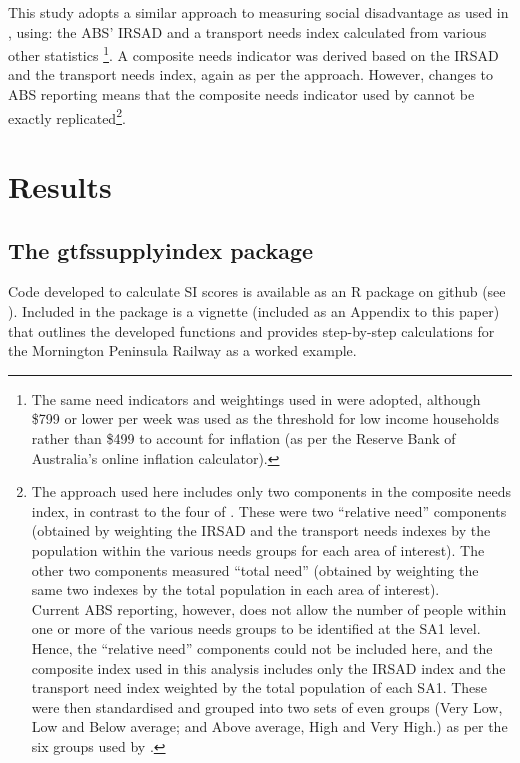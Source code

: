 \documentclass[preprint, 3p,
authoryear]{elsarticle} %
\begin{document}
This study adopts a similar approach to measuring social disadvantage as
used in \citet{currie2010identifying}, using: the ABS' IRSAD and a
transport needs index calculated from various other statistics
\footnote{The same need indicators and weightings used in
  \citet{currie2010identifying} were adopted, although \$799 or lower
  per week was used as the threshold for low income households rather
  than \$499 to account for inflation (as per the Reserve Bank of
  Australia's online inflation calculator).}. A composite needs
indicator was derived based on the IRSAD and the transport needs index,
again as per the \citet{currie2010identifying} approach. However,
changes to ABS reporting means that the composite needs indicator used
by \citet{currie2010identifying} cannot be exactly
replicated\footnote{The approach used here includes only two components
  in the composite needs index, in contrast to the four of
  \citet{currie2010identifying}. These were two ``relative need''
  components (obtained by weighting the IRSAD and the transport needs
  indexes by the population within the various needs groups for each
  area of interest). The other two components measured ``total need''
  (obtained by weighting the same two indexes by the total population in
  each area of interest).\\
  Current ABS reporting, however, does not allow the number of people
  within one or more of the various needs groups to be identified at the
  SA1 level. Hence, the ``relative need'' components could not be
  included here, and the composite index used in this analysis includes
  only the IRSAD index and the transport need index weighted by the
  total population of each SA1. These were then standardised and grouped
  into two sets of even groups (Very Low, Low and Below average; and
  Above average, High and Very High.) as per the six groups used by
  \citet{currie2010identifying}.}.

\section{Results}\label{results}

\subsection{The gtfssupplyindex
package}\label{the-gtfssupplyindex-package}

Code developed to calculate SI scores is available as an R package on
github (see \citet{gtfssupplyindex_github}). Included in the package is
a vignette (included as an Appendix to this paper) that outlines the
developed functions and provides step-by-step calculations for the
Mornington Peninsula Railway as a worked example.
\end{document}
